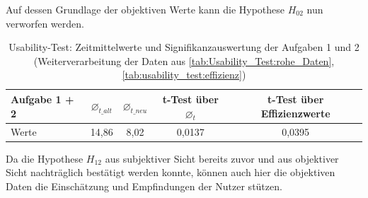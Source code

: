 Auf dessen Grundlage der objektiven Werte kann die Hypothese $H_{02}$ nun verworfen werden.


\begin{table}[h]
    \centering
    \begin{tabular}{|l|c|c|c||c|}
    \hline
        Aufgabe 1 + 2 & $\varnothing_{t\_alt}$ & $\varnothing_{t\_neu}$ & t-Test über $\varnothing_t$ & t-Test über Effizienzwerte \\ \hline
        Werte & 14,86 & 8,02 & 0,0137 & 0,0395 \\ \hline
    \end{tabular}
    \caption{Usability-Test: Zeitmittelwerte und Signifikanzauswertung der Aufgaben 1 und 2 (Weiterverarbeitung der Daten aus \autoref{tab:Usability_Test:rohe_Daten}, \autoref{tab:usability_test:effizienz})}
    \label{tab:Usability-Test:ttest_1+2}
\end{table}

\noindent
Da die Hypothese $H_{12}$ aus subjektiver Sicht bereits zuvor und aus objektiver Sicht nachträglich bestätigt werden konnte, können auch hier die objektiven Daten die Einschätzung und Empfindungen der Nutzer stützen.
